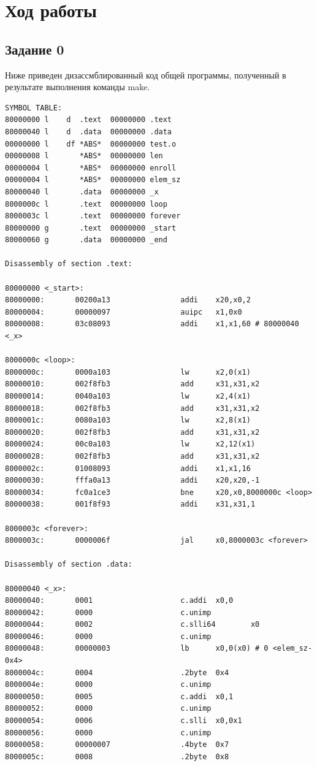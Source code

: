 \chapter{Ход работы}

\section{Задание 0}

Ниже приведен дизассмблированный код общей программы, получен\-ный 
в результате выполнения команды make.

\begin{lstlisting}[label={common_asm}, caption=Дизассемблированный код общей программы]
SYMBOL TABLE:
80000000 l    d  .text  00000000 .text
80000040 l    d  .data  00000000 .data
00000000 l    df *ABS*  00000000 test.o
00000008 l       *ABS*  00000000 len
00000004 l       *ABS*  00000000 enroll
00000004 l       *ABS*  00000000 elem_sz
80000040 l       .data  00000000 _x
8000000c l       .text  00000000 loop
8000003c l       .text  00000000 forever
80000000 g       .text  00000000 _start
80000060 g       .data  00000000 _end

Disassembly of section .text:

80000000 <_start>:
80000000:       00200a13                addi    x20,x0,2
80000004:       00000097                auipc   x1,0x0
80000008:       03c08093                addi    x1,x1,60 # 80000040 <_x>

8000000c <loop>:
8000000c:       0000a103                lw      x2,0(x1)
80000010:       002f8fb3                add     x31,x31,x2
80000014:       0040a103                lw      x2,4(x1)
80000018:       002f8fb3                add     x31,x31,x2
8000001c:       0080a103                lw      x2,8(x1)
80000020:       002f8fb3                add     x31,x31,x2
80000024:       00c0a103                lw      x2,12(x1)
80000028:       002f8fb3                add     x31,x31,x2
8000002c:       01008093                addi    x1,x1,16
80000030:       fffa0a13                addi    x20,x20,-1
80000034:       fc0a1ce3                bne     x20,x0,8000000c <loop>
80000038:       001f8f93                addi    x31,x31,1

8000003c <forever>:
8000003c:       0000006f                jal     x0,8000003c <forever>

Disassembly of section .data:

80000040 <_x>:
80000040:       0001                    c.addi  x0,0
80000042:       0000                    c.unimp
80000044:       0002                    c.slli64        x0
80000046:       0000                    c.unimp
80000048:       00000003                lb      x0,0(x0) # 0 <elem_sz-0x4>
8000004c:       0004                    .2byte  0x4
8000004e:       0000                    c.unimp
80000050:       0005                    c.addi  x0,1
80000052:       0000                    c.unimp
80000054:       0006                    c.slli  x0,0x1
80000056:       0000                    c.unimp
80000058:       00000007                .4byte  0x7
8000005c:       0008                    .2byte  0x8
\end{lstlisting}

